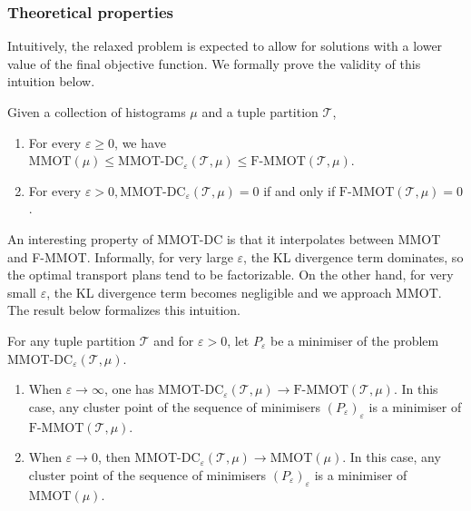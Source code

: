 \subsubsection*{Theoretical properties}
Intuitively, the relaxed problem is expected to allow for solutions with a lower value of the final objective function. We formally prove the validity of this intuition below.
\begin{proposition}
  \label{MMOT_dc_prop}
  Given a collection of histograms $\mu$ and a tuple partition $\mathcal T$,
  \begin{enumerate}
    \item For every $\varepsilon \geq 0$, we have $\text{MMOT}(\mu) \leq
    \text{MMOT-DC}_{\varepsilon}(\mathcal T, \mu) \leq \text{F-MMOT}( \mathcal T, \mu)$.
    \item For every $\varepsilon > 0, \text{MMOT-DC}_{\varepsilon}( \mathcal T, \mu ) = 0$ if and only if
    $\text{F-MMOT} (\mathcal T, \mu) = 0$.
  \end{enumerate}
\end{proposition}
An interesting property of MMOT-DC is that it interpolates between MMOT and F-MMOT. Informally,
for very large $\varepsilon$, the KL divergence term dominates, so the optimal transport plans tend to be factorizable.
On the other hand, for very small $\varepsilon$, the KL divergence term becomes negligible and we approach MMOT.
The result below formalizes this intuition.
\begin{proposition}
  \label{interpolation_prop}
  For any tuple partition $\mathcal T$ and for $\varepsilon > 0$,
  let $P_{\varepsilon}$ be a minimiser of the problem $\text{MMOT-DC}_{\varepsilon}(\mathcal T, \mu)$.
  \begin{enumerate}
    \item When $\varepsilon \to \infty$, one has $\text{MMOT-DC}_{\varepsilon}(\mathcal T, \mu) \to
    \text{F-MMOT}(\mathcal T, \mu)$. In this case, any cluster point of the sequence of minimisers
    $(P_{\varepsilon})_{\varepsilon}$ is a minimiser of $\text{F-MMOT}(\mathcal T, \mu)$.

    \item When $\varepsilon \to 0$, then $\text{MMOT-DC}_{\varepsilon}(\mathcal T, \mu) \to \text{MMOT}(\mu)$.
    In this case, any cluster point of the sequence of minimisers $(P_{\varepsilon})_{\varepsilon}$ is a minimiser of
    $\text{MMOT}(\mu)$.
  \end{enumerate}
\end{proposition}
